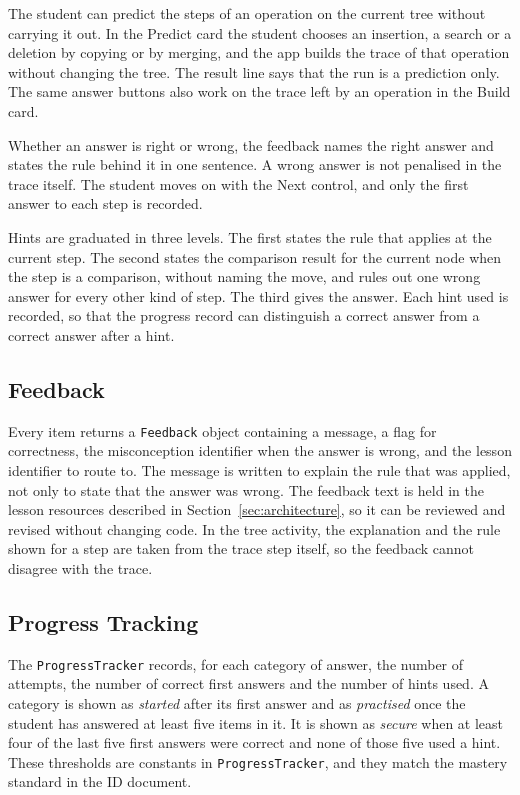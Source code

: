 The student can predict the steps of an operation on the current tree without carrying it out. In the Predict card the student chooses an insertion, a search or a deletion by copying or by merging, and the app builds the trace of that operation without changing the tree. The result line says that the run is a prediction only. The same answer buttons also work on the trace left by an operation in the Build card.

Whether an answer is right or wrong, the feedback names the right answer and states the rule behind it in one sentence. A wrong answer is not penalised in the trace itself. The student moves on with the Next control, and only the first answer to each step is recorded.

Hints are graduated in three levels. The first states the rule that applies at the current step. The second states the comparison result for the current node when the step is a comparison, without naming the move, and rules out one wrong answer for every other kind of step. The third gives the answer. Each hint used is recorded, so that the progress record can distinguish a correct answer from a correct answer after a hint.

\subsection{Feedback}
Every item returns a \texttt{Feedback} object containing a message, a flag for correctness, the misconception identifier when the answer is wrong, and the lesson identifier to route to. The message is written to explain the rule that was applied, not only to state that the answer was wrong. The feedback text is held in the lesson resources described in Section~\ref{sec:architecture}, so it can be reviewed and revised without changing code. In the tree activity, the explanation and the rule shown for a step are taken from the trace step itself, so the feedback cannot disagree with the trace.

\subsection{Progress Tracking}
The \texttt{ProgressTracker} records, for each category of answer, the number of attempts, the number of correct first answers and the number of hints used. A category is shown as \emph{started} after its first answer and as \emph{practised} once the student has answered at least five items in it. It is shown as \emph{secure} when at least four of the last five first answers were correct and none of those five used a hint. These thresholds are constants in \texttt{ProgressTracker}, and they match the mastery standard in the ID document.

